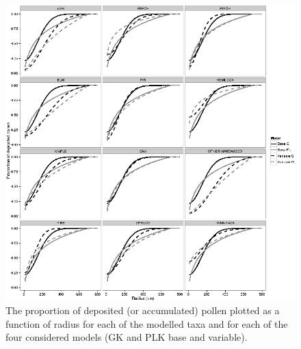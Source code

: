 \begin{figure}
\centering
\includegraphics[width=7in]{figures/kernel_discrete_cdfs.png}
\caption[]{\internallinenumbers \doublespacing The proportion of deposited (or accumulated) pollen plotted
  as a function of radius for each of the modelled taxa and for each
  of the four considered models (GK and PLK base and variable).}
\label{fig:cdf}
\end{figure}


